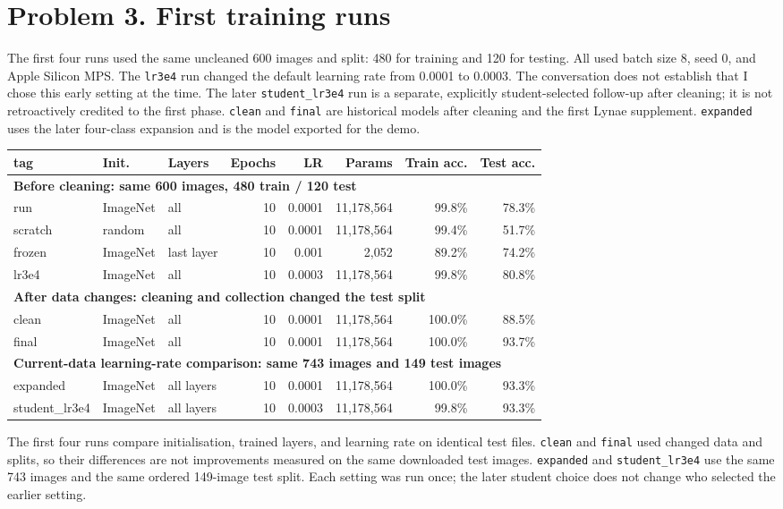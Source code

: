 \documentclass[11pt]{article}
\begin{document}
\section*{Problem 3. First training runs}
The first four runs used the same uncleaned 600 images and split: 480 for training and 120 for testing. All used batch size 8, seed 0, and Apple Silicon MPS. The \texttt{lr3e4} run changed the default learning rate from 0.0001 to 0.0003. The conversation does not establish that I chose this early setting at the time. The later \texttt{student\_lr3e4} run is a separate, explicitly student-selected follow-up after cleaning; it is not retroactively credited to the first phase. \texttt{clean} and \texttt{final} are historical models after cleaning and the first Lynae supplement. \texttt{expanded} uses the later four-class expansion and is the model exported for the demo.
\begin{center}\scriptsize
\setlength{\tabcolsep}{3pt}
\begin{tabular}{lllrrrrr}
\toprule
tag & Init. & Layers & Epochs & LR & Params & Train acc. & Test acc. \\
\midrule
\multicolumn{8}{l}{\textbf{Before cleaning: same 600 images, 480 train / 120 test}} \\
run & ImageNet & all & 10 & 0.0001 & 11,178,564 & 99.8\% & 78.3\% \\
scratch & random & all & 10 & 0.0001 & 11,178,564 & 99.4\% & 51.7\% \\
frozen & ImageNet & last layer & 10 & 0.001 & 2,052 & 89.2\% & 74.2\% \\
lr3e4 & ImageNet & all & 10 & 0.0003 & 11,178,564 & 99.8\% & 80.8\% \\
\midrule
\multicolumn{8}{l}{\textbf{After data changes: cleaning and collection changed the test split}} \\
clean & ImageNet & all & 10 & 0.0001 & 11,178,564 & 100.0\% & 88.5\% \\
final & ImageNet & all & 10 & 0.0001 & 11,178,564 & 100.0\% & 93.7\% \\
\midrule
\multicolumn{8}{l}{\textbf{Current-data learning-rate comparison: same 743 images and 149 test images}} \\
expanded & ImageNet & all layers & 10 & 0.0001 & 11,178,564 & 100.0\% & 93.3\% \\
student\_lr3e4 & ImageNet & all layers & 10 & 0.0003 & 11,178,564 & 99.8\% & 93.3\% \\
\bottomrule
\end{tabular}
\end{center}
The first four runs compare initialisation, trained layers, and learning rate on identical test files. \texttt{clean} and \texttt{final} used changed data and splits, so their differences are not improvements measured on the same downloaded test images. \texttt{expanded} and \texttt{student\_lr3e4} use the same 743 images and the same ordered 149-image test split. Each setting was run once; the later student choice does not change who selected the earlier setting.
\end{document}
